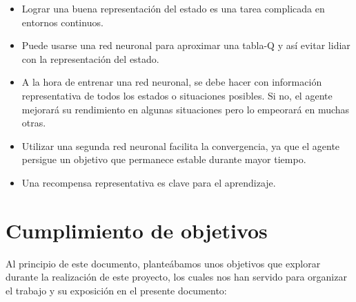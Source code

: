 \begin{itemize}
    \item Lograr una buena representación del estado es una tarea complicada en entornos continuos.
    \item Puede usarse una red neuronal para aproximar una tabla-Q y así evitar lidiar con la representación del estado.
    \item A la hora de entrenar una red neuronal, se debe hacer con información representativa de todos los estados o situaciones posibles. Si no, el agente mejorará su rendimiento en algunas situaciones pero lo empeorará en muchas otras.
    \item Utilizar una segunda red neuronal facilita la convergencia, ya que el agente persigue un objetivo que permanece estable durante mayor tiempo.
    \item Una recompensa representativa es clave para el aprendizaje.
\end{itemize}

\section{Cumplimiento de objetivos}

Al principio de este documento, planteábamos unos objetivos que explorar durante la realización de este proyecto, los cuales nos han servido para organizar el trabajo y su exposición en el presente documento:

